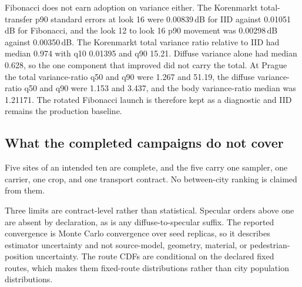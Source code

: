 Fibonacci does not earn adoption on variance either. The Korenmarkt
total-transfer p90 standard errors at look 16 were 0.00839\,dB for IID against
0.01051\,dB for Fibonacci, and the look 12 to look 16 p90 movement was
0.00298\,dB against 0.00350\,dB. The Korenmarkt total variance ratio relative to
IID had median 0.974 with q10 0.01395 and q90 15.21. Diffuse variance alone had
median 0.628, so the one component that improved did not carry the total. At
Prague the total variance-ratio q50 and q90 were 1.267 and 51.19, the diffuse
variance-ratio q50 and q90 were 1.153 and 3.437, and the body variance-ratio
median was 1.21171. The rotated Fibonacci launch is therefore kept as a
diagnostic and IID remains the production baseline.


\subsection{What the completed campaigns do not cover}
\label{sec:roofline-limits}

Five sites of an intended ten are complete, and the five carry one sampler,
one carrier, one crop, and one transport contract. No between-city ranking is
claimed from them.

Three limits are contract-level rather than statistical. Specular orders above
one are absent by declaration, as is any diffuse-to-specular suffix. The
reported convergence is Monte Carlo convergence over seed replicas, so it
describes estimator uncertainty and not source-model, geometry, material, or
pedestrian-position uncertainty. The route CDFs are conditional on the declared
fixed routes, which makes them fixed-route distributions rather than city
population distributions.


